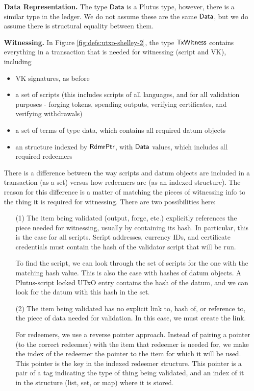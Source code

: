 \textbf{Data Representation.}
The type $\mathsf{Data}$ is a Plutus type, however, there is a similar type in the
ledger. We do not assume these are the same $\mathsf{Data}$, but we do assume there
is structural equality between them.

\textbf{Witnessing.}
In Figure \ref{fig:defs:utxo-shelley-2}, the type $\mathsf{TxWitness}$ contains everything
in a transaction that is needed for witnessing (script and VK), including

\begin{itemize}
  \item VK signatures, as before
  \item a set of scripts (this includes scripts of all languages, and for all
  validation purposes - forging tokens, spending outputs, verifying certificates, and
  verifying withdrawals)
  \item a set of terms of type data, which contains all required datum objects
  \item an structure indexed by $\mathsf{RdmrPtr}$, with $\mathsf{Data}$ values, which includes all
  required redeemers
\end{itemize}

There is a difference between the way scripts and datum objects are included in
a transaction (as a set) versus how redeemers are
(as an indexed structure). The reason for this difference is a matter of matching
the pieces of witnessing info to the thing it is required for witnessing. There
are two possibilities here:

\begin{itemize}
  \item[(1)] The item being validated (output, forge, etc.) explicitly references
  the piece needed for witnessing, usually by containing its hash.
  In particular, this is the case for all scripts.
  Script addresses, currency IDs, and certificate credentials must contain
  the hash of the validator script that will be run.

  To find the script, we can look through
  the set of scripts for the one with the matching hash value.
  This is also the case with hashes of datum objects. A Plutus-script locked
  UTxO entry contains the hash of the datum, and we can look for
  the datum with this hash in the set.

  \item[(2)] The item being validated has no explicit link to, hash of, or
  reference to, the piece of data needed for validation. In this case, we must create
  the link.

  For redeemers, we use a reverse pointer approach. Instead of pairing
  a pointer (to the correct redeemer) with the item that redeemer is needed for,
  we make the index of the redeemer the pointer to the item for
  which it will be used. This pointer is the key in the indexed redeemer structure.
  This pointer is a pair of a tag indicating the type of
  thing being validated, and an index of it in the structure (list, set, or map)
  where it is stored.
\end{itemize}

